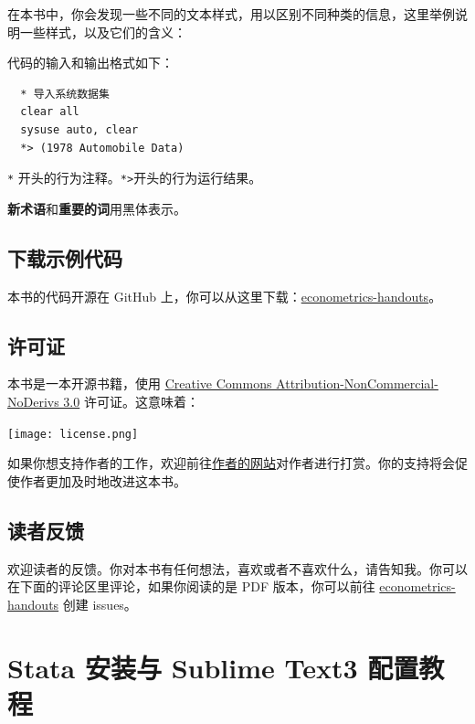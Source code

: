 \documentclass[cn,fancy,blue,11pt]{elegantbook}
\begin{document}
在本书中，你会发现一些不同的文本样式，用以区别不同种类的信息，这里举例说明一些样式，以及它们的含义：

代码的输入和输出格式如下：

\begin{lstlisting}
  * 导入系统数据集
  clear all
  sysuse auto, clear
  *> (1978 Automobile Data)
\end{lstlisting}

\lstinline{*} 开头的行为注释。\lstinline{*>}开头的行为运行结果。

\textbf{新术语}和\textbf{重要的词}用黑体表示。

\hypertarget{section-5}{%
\section{下载示例代码}\label{section-5}}

本书的代码开源在 GitHub 上，你可以从这里下载：\href{https://github.com/czxa/econometrics-handouts}{econometrics-handouts}。

\hypertarget{section-6}{%
\section{许可证}\label{section-6}}

本书是一本开源书籍，使用 \href{http://creativecommons.org/licenses/by-nc-nd/3.0/us/}{Creative Commons Attribution-NonCommercial-NoDerivs 3.0} 许可证。这意味着：

\noindent\texttt{[image: license.png]}

如果你想支持作者的工作，欢迎前往\href{https://czxa.top}{作者的网站}对作者进行打赏。你的支持将会促使作者更加及时地改进这本书。

\hypertarget{section-7}{%
\section{读者反馈}\label{section-7}}

欢迎读者的反馈。你对本书有任何想法，喜欢或者不喜欢什么，请告知我。你可以在下面的评论区里评论，如果你阅读的是 PDF 版本，你可以前往 \href{https://github.com/czxa/econometrics-handouts}{econometrics-handouts} 创建 issues。

\hypertarget{stata--sublime-text3-}{%
\chapter{Stata 安装与 Sublime Text3 配置教程}\label{stata--sublime-text3-}}
\end{document}
